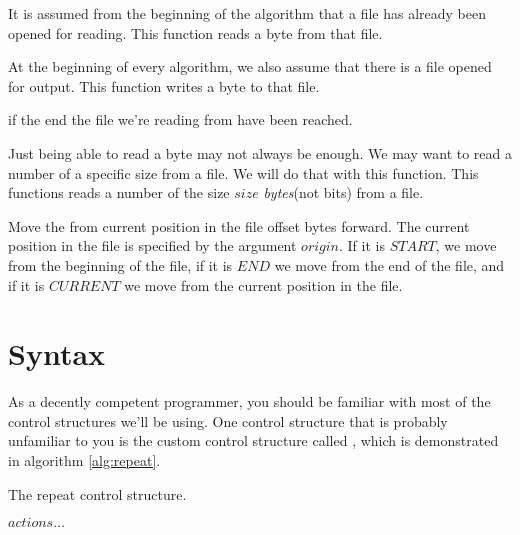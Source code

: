 \begin{description}[font=\normalfont]
\item[\textproc{ReadByte}] It is assumed from the beginning of the
  algorithm that a file has already been opened for reading. This
  function reads a byte from that file.

\item[\Call{WriteByte}{$byte$}] At the beginning of every algorithm,
  we also assume that there is a file opened for output. This function
  writes a byte to that file.

\item[\textproc{EndOfFileReached}] \True{} if the end the file we're
  reading from have been reached.

\item[\Call{Read}{$size$}] Just being able to read a byte may not
  always be enough. We may want to read a number of a specific size
  from a file. We will do that with this function. This functions
  reads a number of the size $size$ \textit{bytes}(not bits) from a
  file.

\item[\Call{Seek}{$offset,origin$}] Move the from current position in
  the file offset bytes forward. The current position in the file is
  specified by the argument $origin$. If it is $START$, we move from the
  beginning of the file, if it is $END$ we move from the end of the
  file, and if it is $CURRENT$ we move from the current position in
  the file.

\end{description}

\section{Syntax}
\label{sec:other-conventions}

As a decently competent programmer, you should be familiar with most
of the control structures we'll be using. One control structure that
is probably unfamiliar to you is the custom control structure called
\algorithmicrepeat, which is demonstrated in algorithm \ref{alg:repeat}.


\begin{algorithm}[H]
  \caption{The repeat control structure.}
  \label{alg:repeat}
  \begin{algorithmic}[1]
      \State $actions\ldots$ 
    \EndRepeatn
  \end{algorithmic}
\end{algorithm}

